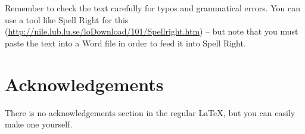 \documentclass[12pt]{report}
\newcommand{\mnras}{MNRAS}
\newcommand{\aap}{A\&A}
\begin{document}
Remember to check the text carefully for typos and grammatical errors. You can
use a tool like Spell Right for this
(\url{http://nile.lub.lu.se/loDownload/101/Spellright.htm}) -- but note that
you must paste the text into a Word file in order to feed it into Spell Right.

\section*{Acknowledgements}

There is no acknowledgements section in the regular LaTeX, but you can easily
make one yourself. \citep{2017A&A...598L...7K}

%



\end{document}
